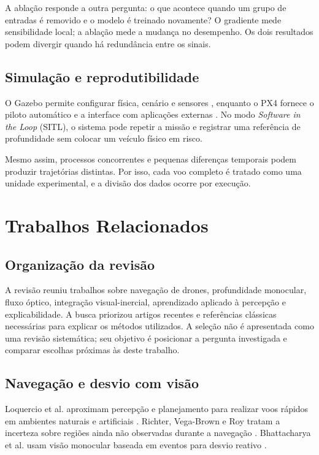 A ablação responde a outra pergunta: o que acontece quando um grupo de entradas é removido e o modelo é treinado novamente? O gradiente mede sensibilidade local; a ablação mede a mudança no desempenho. Os dois resultados podem divergir quando há redundância entre os sinais.

\section{Simulação e reprodutibilidade}

O Gazebo permite configurar física, cenário e sensores \cite{Koenig7803}, enquanto o PX4 fornece o piloto automático e a interface com aplicações externas \cite{Meier8092}. No modo \textit{Software in the Loop} (SITL), o sistema pode repetir a missão e registrar uma referência de profundidade sem colocar um veículo físico em risco.

Mesmo assim, processos concorrentes e pequenas diferenças temporais podem produzir trajetórias distintas. Por isso, cada voo completo é tratado como uma unidade experimental, e a divisão dos dados ocorre por execução.

\chapter{Trabalhos Relacionados}\label{cap:relacionados}

\section{Organização da revisão}

A revisão reuniu trabalhos sobre navegação de drones, profundidade monocular, fluxo óptico, integração visual-inercial, aprendizado aplicado à percepção e explicabilidade. A busca priorizou artigos recentes e referências clássicas necessárias para explicar os métodos utilizados. A seleção não é apresentada como uma revisão sistemática; seu objetivo é posicionar a pergunta investigada e comparar escolhas próximas às deste trabalho.

\section{Navegação e desvio com visão}

Loquercio et al. aproximam percepção e planejamento para realizar voos rápidos em ambientes naturais e artificiais \cite{Loquercio2021}. Richter, Vega-Brown e Roy tratam a incerteza sobre regiões ainda não observadas durante a navegação \cite{BayesianLearning2015}. Bhattacharya et al. usam visão monocular baseada em eventos para desvio reativo \cite{Bhattacharya2024}.


